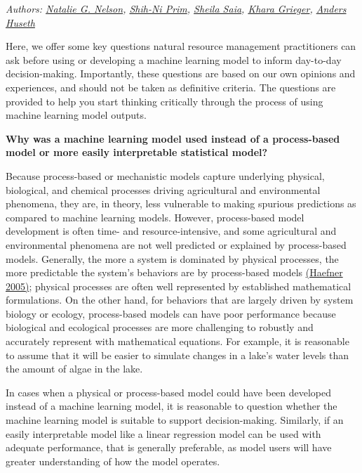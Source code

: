\documentclass[
]{book}
\begin{document}
\emph{Authors: \href{https://bae.ncsu.edu/people/nnelson4/}{Natalie G. Nelson}, \href{https://www.linkedin.com/in/shih-ni-prim-14033336/}{Shih-Ni Prim}, \href{https://sheilasaia.rbind.io/}{Sheila Saia}, \href{https://cals.ncsu.edu/applied-ecology/people/kdgriege/}{Khara Grieger}, \href{https://cals.ncsu.edu/entomology-and-plant-pathology/people/ashuseth/}{Anders Huseth}}

Here, we offer some key questions natural resource management practitioners can ask before using or developing a machine learning model to inform day-to-day decision-making. Importantly, these questions are based on our own opinions and experiences, and should not be taken as definitive criteria. The questions are provided to help you start thinking critically through the process of using machine learning model outputs.

\textbf{Why was a machine learning model used instead of a process-based model or more easily interpretable statistical model?}

Because process-based or mechanistic models capture underlying physical, biological, and chemical processes driving agricultural and environmental phenomena, they are, in theory, less vulnerable to making spurious predictions as compared to machine learning models. However, process-based model development is often time- and resource-intensive, and some agricultural and environmental phenomena are not well predicted or explained by process-based models. Generally, the more a system is dominated by physical processes, the more predictable the system's behaviors are by process-based models \href{https://link.springer.com/book/10.1007/b106568}{(Haefner 2005)}; physical processes are often well represented by established mathematical formulations. On the other hand, for behaviors that are largely driven by system biology or ecology, process-based models can have poor performance because biological and ecological processes are more challenging to robustly and accurately represent with mathematical equations. For example, it is reasonable to assume that it will be easier to simulate changes in a lake's water levels than the amount of algae in the lake.

In cases when a physical or process-based model could have been developed instead of a machine learning model, it is reasonable to question whether the machine learning model is suitable to support decision-making. Similarly, if an easily interpretable model like a linear regression model can be used with adequate performance, that is generally preferable, as model users will have greater understanding of how the model operates.
\end{document}
